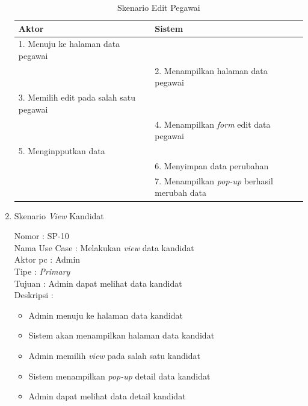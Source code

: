 \begin{enumerate}
\begin{itemize}
\end{itemize}

\begin{table}
	\caption{Skenario Edit Pegawai}
	\centering
	\begin{tabular}{ | p{72mm} | p{56mm} |}
		\hline 
		\textbf{Aktor} & \textbf{Sistem} \\
		\hline
		
		1.	Menuju ke halaman data pegawai &  \\
		
		\hline
		
		&  2.	Menampilkan halaman data pegawai \\
		
		\hline
		
		3. Memilih edit pada salah satu pegawai & \\
		
		\hline
		
		& 4.	Menampilkan \textit{form} edit data pegawai \\
		
		\hline
		
		5.	Menginpputkan data  & \\
		\hline
		
			& 6.	Menyimpan data perubahan \\
		
		\hline
		
		& 7.	Menampilkan \textit{pop-up} berhasil merubah data \\
		
		\hline
		
		
	\end{tabular}
\end{table}

\newpage

\item Skenario \textit{View} Kandidat

Nomor \kern 3.6pc : SP-10 \\
Nama Use Case : Melakukan \textit{view} data kandidat \\
Aktor  pc : Admin \\
Tipe \kern 4.6pc : \textit{Primary} \\
Tujuan \kern 3.6pc : Admin dapat melihat data kandidat \\
Deskripsi \kern 2.5pc : 

\begin{itemize}
	\item Admin menuju ke halaman data kandidat
	\item Sistem akan menampilkan halaman data kandidat
	\item Admin memilih \textit{view} pada salah satu kandidat
	\item Sistem menampilkan \textit{pop-up} detail data kandidat
	\item Admin dapat melihat data detail kandidat
	

\end{itemize}
\end{enumerate}

